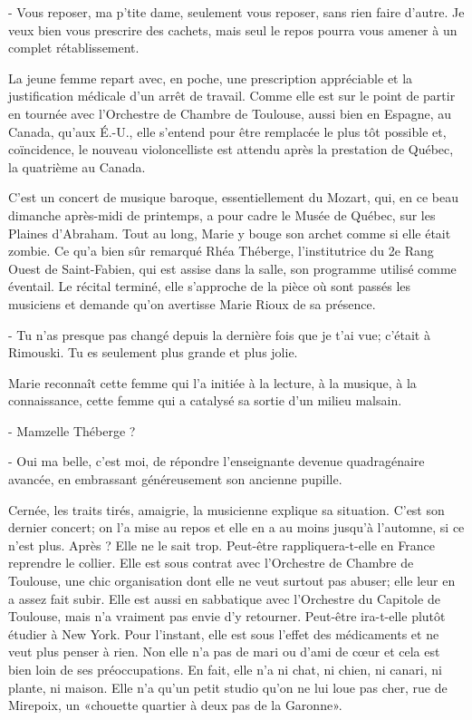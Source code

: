 - Vous reposer, ma p’tite dame, seulement vous reposer, sans rien faire d’autre. Je veux bien vous prescrire des cachets, mais seul le repos pourra vous amener à un complet rétablissement.

La jeune femme repart avec, en poche, une prescription appréciable et la justification médicale d’un arrêt de travail. Comme elle est sur le point de partir en tournée avec l’Orchestre de Chambre de Toulouse, aussi bien en Espagne, au Canada, qu’aux É.-U., elle s’entend pour être remplacée le plus tôt possible et, coïncidence, le nouveau violoncelliste est attendu après la prestation de Québec, la quatrième au Canada.

C’est un concert de musique baroque, essentiellement du Mozart, qui, en ce beau dimanche après-midi de printemps, a pour cadre le Musée de Québec, sur les Plaines d’Abraham. Tout au long, Marie y bouge son archet comme si elle était zombie. Ce qu’a bien sûr remarqué Rhéa Théberge, l’institutrice du 2e Rang Ouest de Saint-Fabien, qui est assise dans la salle, son programme utilisé comme éventail. Le récital terminé, elle s’approche de la pièce où sont passés les musiciens et demande qu’on avertisse Marie Rioux de sa présence.

- Tu n’as presque pas changé depuis la dernière fois que je t’ai vue; c’était à Rimouski. Tu es seulement plus grande et plus jolie.

Marie reconnaît cette femme qui l’a initiée à la lecture, à la musique, à la connaissance, cette femme qui a catalysé sa sortie d’un milieu malsain.

- Mamzelle Théberge ?

- Oui ma belle, c’est moi, de répondre l’enseignante devenue quadragénaire avancée, en embrassant généreusement son ancienne pupille.

Cernée, les traits tirés, amaigrie, la musicienne explique sa situation. C’est son dernier concert; on l’a mise au repos et elle en a au moins jusqu’à l’automne, si ce n’est plus. Après ? Elle ne le sait trop. Peut-être rappliquera-t-elle en France reprendre le collier. Elle est sous contrat avec l’Orchestre de Chambre de Toulouse, une chic organisation dont elle ne veut surtout pas abuser; elle leur en a assez fait subir. Elle est aussi en sabbatique avec l’Orchestre du Capitole de Toulouse, mais n’a vraiment pas envie d’y retourner. Peut-être ira-t-elle plutôt étudier à New York. Pour l’instant, elle est sous l’effet des médicaments et ne veut plus penser à rien. Non elle n’a pas de mari ou d’ami de cœur et cela est bien loin de ses préoccupations. En fait, elle n’a ni chat, ni chien, ni canari, ni plante, ni maison. Elle n’a qu’un petit studio qu’on ne lui loue pas cher, rue de Mirepoix, un «chouette quartier à deux pas de la Garonne».

